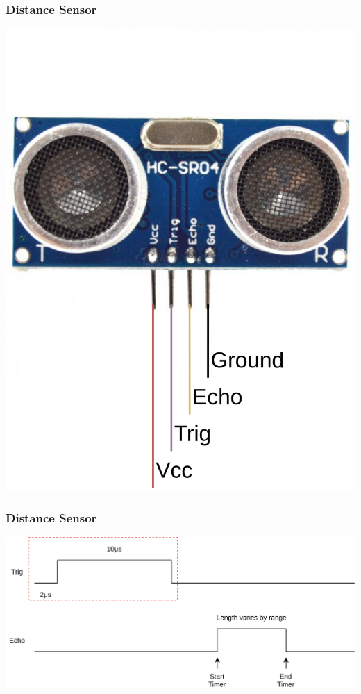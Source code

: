 \documentclass{beamer}
\begin{document}
\begin{frame}
    \frametitle{Distance Sensor}
    \centering
    \includegraphics[scale=0.08]{img/hcsr04.png}
\end{frame}

\begin{frame}
    \frametitle{Distance Sensor}
    \includegraphics[width=\linewidth]{img/ultrasonic-sensor.png}
\end{frame}
\end{document}
